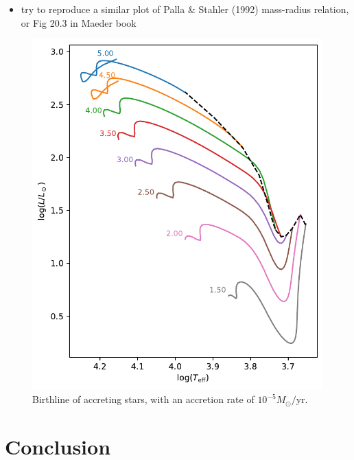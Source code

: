 \documentclass[12pt,a4paper]{article}
\newcommand{\mr}{\mathrm}
\newenvironment{outline}[1]{%
  \begin{itemize}[label=\textbullet]%
  \color{#1}%
}{%
  \end{itemize}%
}
\begin{document}
\begin{outline}{gray}
  \item try to reproduce a similar plot of Palla \& Stahler (1992) mass-radius relation, or Fig 20.3 in Maeder book
\end{outline}

\begin{figure}
  \centering  
  \includegraphics[width=.65\textwidth,keepaspectratio]{birthline_acce5.pdf}
  \caption{Birthline of accreting stars, with an accretion rate of $10^{-5} M_\odot/\mr{yr}$.} \label{fig:birthline_acce5}
\end{figure}




\section{Conclusion}
\label{sec:conclusion}
\end{document}
